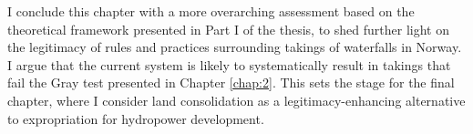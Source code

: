 


I conclude this chapter with a more overarching assessment based on the theoretical framework presented in Part I of the thesis, to shed further light on the legitimacy of rules and practices surrounding takings of waterfalls in Norway. I argue that the current system is likely to systematically result in takings that fail the Gray test presented in Chapter \ref{chap:2}. This sets the stage for the final chapter, where I consider land consolidation as a legitimacy-enhancing alternative to expropriation for hydropower development.


